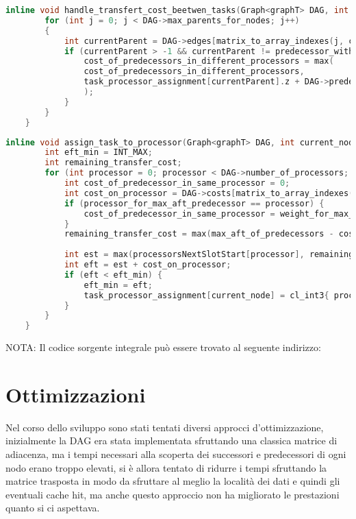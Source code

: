\begin{lstlisting}[language=C++, caption={Funzione di gestione del costo di trasferimento dati tra task},captionpos=b]
	inline void handle_transfert_cost_beetwen_tasks(Graph<graphT> DAG, int current_node, int predecessor_with_max_aft, int max_aft_of_predecessors, int processor_for_max_aft_predecessor, int weight_for_max_aft_predecessor) {
		for (int j = 0; j < DAG->max_parents_for_nodes; j++)
		{
			int currentParent = DAG->edges[matrix_to_array_indexes(j, current_node, DAG->len)];
			if (currentParent > -1 && currentParent != predecessor_with_max_aft) {
				cost_of_predecessors_in_different_processors = max(
				cost_of_predecessors_in_different_processors,
				task_processor_assignment[currentParent].z + DAG->predecessors[matrix_to_array_indexes(j, current_node, DAG->len)]
				);
			}
		}
	}
\end{lstlisting}
\begin{lstlisting}[language=C++, caption={Funzione che gestisce lo scheduling del task su un processore},captionpos=b]
	inline void assign_task_to_processor(Graph<graphT> DAG, int current_node, int max_aft_of_predecessors, int processor_for_max_aft_predecessor, int weight_for_max_aft_predecessor, int cost_of_predecessors_in_different_processors) {
		int eft_min = INT_MAX;
		int remaining_transfer_cost;
		for (int processor = 0; processor < DAG->number_of_processors; processor++) {
			int cost_of_predecessor_in_same_processor = 0;
			int cost_on_processor = DAG->costs[matrix_to_array_indexes(current_node, processor, DAG->number_of_processors)];
			if (processor_for_max_aft_predecessor == processor) {
				cost_of_predecessor_in_same_processor = weight_for_max_aft_predecessor;
			}
			remaining_transfer_cost = max(max_aft_of_predecessors - cost_of_predecessor_in_same_processor, cost_of_predecessors_in_different_processors);
			
			int est = max(processorsNextSlotStart[processor], remaining_transfer_cost);
			int eft = est + cost_on_processor;
			if (eft < eft_min) {
				eft_min = eft;
				task_processor_assignment[current_node] = cl_int3{ processor, est, eft };
			}
		}
	}
\end{lstlisting}

NOTA: Il codice sorgente integrale può essere trovato al seguente indirizzo: 

\section{Ottimizzazioni}
Nel corso dello sviluppo sono stati tentati diversi approcci d'ottimizzazione, inizialmente la DAG era stata implementata sfruttando una classica matrice di adiacenza, ma i tempi necessari alla scoperta dei successori e predecessori di ogni nodo erano troppo elevati, si è allora tentato di ridurre i tempi sfruttando la matrice trasposta in modo da sfruttare al meglio la località dei dati e quindi gli eventuali cache hit, ma anche questo approccio non ha migliorato le prestazioni quanto si ci aspettava.

